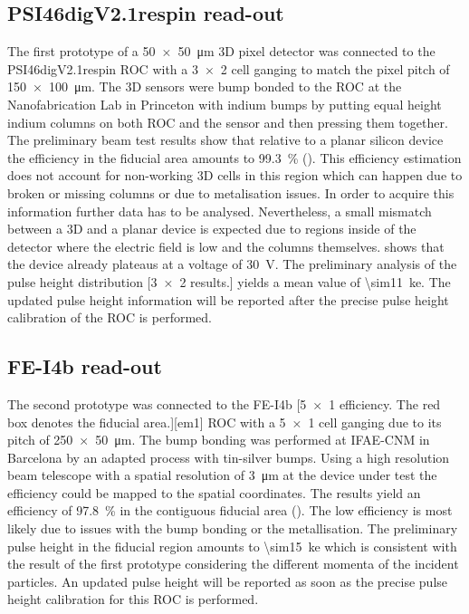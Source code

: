 \subsection{PSI46digV2.1respin read-out}
The first prototype of a \SI{50x50}{\micro\meter} 3D pixel detector was connected to the PSI46digV2.1respin \ac{ROC} \cite{kornmayer} with a \SI{3x2}{} cell ganging to match the pixel pitch of \SI{150x100}{\micro\meter}. The 3D sensors were bump bonded to the \ac{ROC} at the Nanofabrication Lab in Princeton with indium bumps by putting equal height indium columns on both \ac{ROC} and the sensor and then pressing them together. The preliminary beam test results show that relative to a planar silicon device the efficiency in the fiducial area amounts to \SI{99.3}{\%} (). This efficiency estimation does not account for non-working 3D cells in this region which can happen due to broken or missing columns or due to metalisation issues. In order to acquire this information further data has to be analysed. Nevertheless, a small mismatch between a 3D and a planar device is expected due to regions inside of the detector where the electric field is low \cite{guilio} and the columns themselves.  shows that the device already plateaus at a voltage of \SI{30}{\volt}. The preliminary analysis of the pulse height distribution 
[\SI{3x2}{} results.]
yields a mean value of \SI{\sim11}{\kilo e}. The updated pulse height information will be reported after the precise pulse height calibration of the \ac{ROC} is performed.
\subsection{FE-I4b read-out}
The second prototype was connected to the FE-I4b 
[\SI{5x1}{} efficiency. The red box denotes the fiducial area.][em1]
\ac{ROC} \cite{fei4} with a \SI{5x1}{} cell ganging due to its pitch of \SI{250x50}{\micro\meter}. The bump bonding was performed at IFAE-CNM in Barcelona by an adapted process with tin-silver bumps. Using a high resolution beam telescope with a spatial resolution of \SI{3}{\micro\meter} at the device under test the efficiency could be mapped to the spatial coordinates. The results yield an efficiency of \SI{97.8}{\%} in the contiguous fiducial area (). The low efficiency is most likely due to issues with the bump bonding or the metallisation. The preliminary pulse height in the fiducial region amounts to \SI{\sim15}{\kilo e} which is consistent with the result of the first prototype considering the different momenta of the incident particles. An updated pulse height will be reported as soon as the precise pulse height calibration for this \ac{ROC} is performed.
